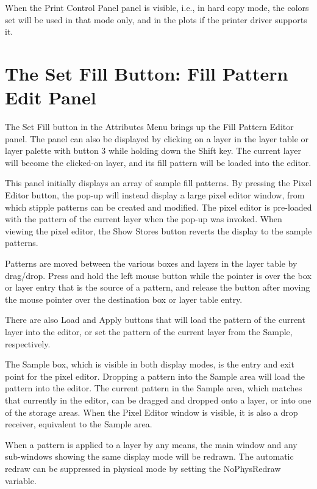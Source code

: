 When the {\cb Print Control Panel} panel is visible, i.e., in hard
copy mode, the colors set will be used in that mode only, and in the
plots if the printer driver supports it.


\section{The {\cb Set Fill} Button: Fill Pattern Edit Panel}
The {\cb Set Fill} button in the {\cb Attributes Menu} brings up the
{\cb Fill Pattern Editor} panel.  The panel can also be displayed by
clicking on a layer in the layer table or layer palette with button 3
while holding down the {\kb Shift} key.  The current layer will become
the clicked-on layer, and its fill pattern will be loaded into the
editor.

This panel initially displays an array of sample fill patterns.  By
pressing the {\cb Pixel Editor} button, the pop-up will instead
display a large pixel editor window, from which stipple patterns can
be created and modified.  The pixel editor is pre-loaded with the
pattern of the current layer when the pop-up was invoked.  When
viewing the pixel editor, the {\cb Show Stores} button reverts the
display to the sample patterns.

Patterns are moved between the various boxes and layers in the layer
table by drag/drop.  Press and hold the left mouse button while the
pointer is over the box or layer entry that is the source of a
pattern, and release the button after moving the mouse pointer over
the destination box or layer table entry.

There are also {\cb Load} and {\cb Apply} buttons that will load the
pattern of the current layer into the editor, or set the pattern of
the current layer from the {\cb Sample}, respectively.

The {\cb Sample} box, which is visible in both display modes, is the
entry and exit point for the pixel editor.  Dropping a pattern into
the {\cb Sample} area will load the pattern into the editor.  The
current pattern in the {\cb Sample} area, which matches that currently
in the editor, can be dragged and dropped onto a layer, or into one of
the storage areas.  When the {\cb Pixel Editor} window is visible, it
is also a drop receiver, equivalent to the {\cb Sample} area.

When a pattern is applied to a layer by any means, the main window and
any sub-windows showing the same display mode will be redrawn.  The
automatic redraw can be suppressed in physical mode by setting the
{\cb NoPhysRedraw} variable.

